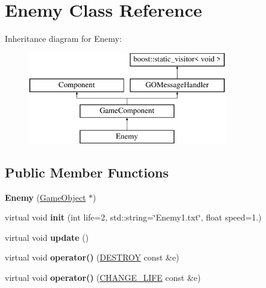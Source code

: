 \hypertarget{class_enemy}{}\section{Enemy Class Reference}
\label{class_enemy}
Inheritance diagram for Enemy\+:\begin{figure}[H]
\begin{center}
\leavevmode
\includegraphics[height=4.000000cm]{class_enemy}
\end{center}
\end{figure}
\subsection*{Public Member Functions}
\begin{DoxyCompactItemize}
\item 
\hypertarget{class_enemy_ae7858f3f39ec6e48b741b7a8eaff6c1d}{}\label{class_enemy_ae7858f3f39ec6e48b741b7a8eaff6c1d} 
{\bfseries Enemy} (\hyperlink{class_game_object}{Game\+Object} $\ast$)
\item 
\hypertarget{class_enemy_a2966f61498d00e488697a80ef4447ebe}{}\label{class_enemy_a2966f61498d00e488697a80ef4447ebe} 
virtual void {\bfseries init} (int life=2, std\+::string=\char`\"{}Enemy1.\+txt\char`\"{}, float speed=1.)
\item 
\hypertarget{class_enemy_ad55ee71b5a8c23fbd00b3c368b90cc64}{}\label{class_enemy_ad55ee71b5a8c23fbd00b3c368b90cc64} 
virtual void {\bfseries update} ()
\item 
\hypertarget{class_enemy_a932135eb4e5987c4e873b4e55a5bf215}{}\label{class_enemy_a932135eb4e5987c4e873b4e55a5bf215} 
virtual void {\bfseries operator()} (\hyperlink{struct_d_e_s_t_r_o_y}{D\+E\+S\+T\+R\+OY} const \&e)
\item 
\hypertarget{class_enemy_a187b85da2861026493d68c81fb4ce5b9}{}\label{class_enemy_a187b85da2861026493d68c81fb4ce5b9} 
virtual void {\bfseries operator()} (\hyperlink{struct_c_h_a_n_g_e___l_i_f_e}{C\+H\+A\+N\+G\+E\+\_\+\+L\+I\+FE} const \&e)
\end{DoxyCompactItemize}
